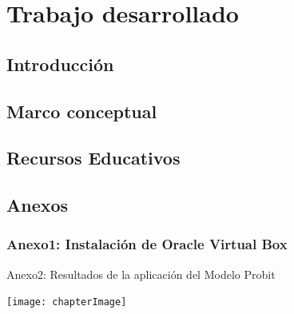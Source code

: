 \documentclass[12pt,fleqn, twoside, letter]{book}
\numberwithin{equation}{section} %
\numberwithin{figure}{section} %
\numberwithin{table}{section} %
\begin{document}

\part{Trabajo desarrollado}\label{Parte2}

\chapter{Introducción}\label{Introduccion}


\chapter{Marco conceptual}\label{marcoConceptual}


\chapter{Recursos Educativos}


\chapter*{Anexos}

\section{Anexo1: Instalación de Oracle Virtual Box}



Anexo2: Resultados de la aplicación del Modelo Probit


\begin{center}
	\texttt{[image: chapterImage]}
\end{center}

\end{document}
